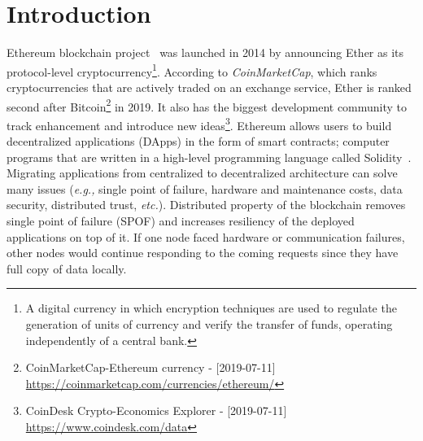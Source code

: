 
\section{Introduction}
\label{sect:introduction}

Ethereum blockchain project~\cite{EthGit} was launched in 2014 by announcing Ether as its protocol-level cryptocurrency\footnote{A digital currency in which encryption techniques are used to regulate the generation of units of currency and verify the transfer of funds, operating independently of a central bank.}. According to \textit{CoinMarketCap}, which ranks cryptocurrencies that are actively traded on an exchange service, Ether is ranked second after Bitcoin\footnote{CoinMarketCap-Ethereum currency - [2019-07-11] \url{https://coinmarketcap.com/currencies/ethereum/}} in 2019. It also has the biggest development community to track enhancement and introduce new ideas\footnote{CoinDesk Crypto-Economics Explorer - [2019-07-11] \url{https://www.coindesk.com/data}}. Ethereum allows users to build decentralized applications (DApps) in the form of smart contracts; computer programs that are written in a high-level programming language called Solidity~\cite{Solidity7:online}. Migrating applications from centralized to decentralized architecture can solve many issues (\textit{e.g.,} single point of failure, hardware and maintenance costs, data security, distributed trust, \textit{etc.}). Distributed property of the blockchain removes single point of failure (SPOF) and increases resiliency of the deployed applications on top of it. If one node faced hardware or communication failures, other nodes would continue responding to the coming requests since they have full copy of data locally.

